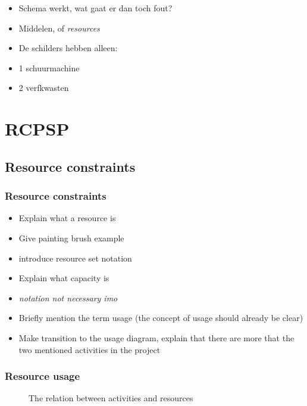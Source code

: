 \documentclass{beamer}
\theoremstyle{definition}
\newcommand{\inputtikz}[1]{}
\newcommand{\mick}[1]{{\color{red}\emph{#1}}}
\begin{document}
\begin{frame}
	\begin{itemize}
		\item Schema werkt, wat gaat er dan toch fout?
		\item Middelen, of \emph{resources}
		\item De schilders hebben alleen:
		\item 1 schuurmachine
		\item 2 verfkwasten
	\end{itemize}
\end{frame}

\section{RCPSP}


\subsection{Resource constraints}
\begin{frame}
	\frametitle{Resource constraints}
	\begin{itemize}
		\item Explain what a resource is
		\item Give painting brush example
		\item introduce resource set notation
		\item Explain what capacity is
		\item \mick{notation not necessary imo}
		\item Briefly mention the term usage (the concept of usage should already be clear)
		\item Make transition to the usage diagram, explain that there are more that the two mentioned activities in the project
	\end{itemize}
\end{frame}
	
\begin{frame}
	\frametitle{Resource usage}
	\vspace{-.2em}
	\begin{figure}[ht]
		\makebox[\textwidth][c]{\resizebox{.7\paperwidth}{!}{
			\inputtikz{usage}
		}}
		\vspace{-1em}
		\caption{The relation between activities and resources}
		\label{fig:activity_graph}
	\end{figure}
\end{frame}
\end{document}
